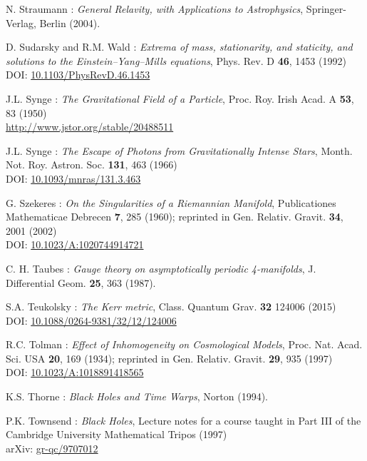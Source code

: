 \begin{thebibliography}{123}
N. Straumann : \emph{General Relavity, with Applications to Astrophysics},
Springer-Verlag, Berlin (2004).

D. Sudarsky and R.M. Wald : {\em Extrema of mass, stationarity, and staticity,
and solutions to the Einstein–Yang–Mills equations},
Phys. Rev. D {\bf 46}, 1453 (1992)\\
DOI: \href{https://doi.org/10.1103/PhysRevD.46.1453}{10.1103/PhysRevD.46.1453}

J.L. Synge : {\em The Gravitational Field of a Particle},
Proc. Roy. Irish Acad. A {\bf 53}, 83 (1950)\\
\url{http://www.jstor.org/stable/20488511}

J.L. Synge : {\em The Escape of Photons from Gravitationally Intense Stars},
Month. Not. Roy. Astron. Soc. {\bf 131}, 463 (1966)\\
DOI: \href{https://doi.org/10.1093/mnras/131.3.463}{10.1093/mnras/131.3.463}

G. Szekeres : {\em On the Singularities of a Riemannian Manifold},
Publicationes Mathematicae Debrecen {\bf 7}, 285 (1960); reprinted in
Gen. Relativ. Gravit. {\bf 34}, 2001 (2002)\\
DOI: \href{https://doi.org/10.1023/A:1020744914721}{10.1023/A:1020744914721}

C. H. Taubes : {\em Gauge theory on asymptotically periodic 4-manifolds},
J. Differential Geom. {\bf 25}, 363 (1987).

S.A. Teukolsky : {\em The Kerr metric},
Class. Quantum Grav. {\bf 32} 124006 (2015)\\
DOI: \href{https://doi.org/10.1088/0264-9381/32/12/124006}{10.1088/0264-9381/32/12/124006}

R.C. Tolman :
{\em Effect of Inhomogeneity on Cosmological Models},
Proc. Nat. Acad. Sci. USA {\bf 20}, 169 (1934);
reprinted in Gen. Relativ. Gravit. {\bf 29}, 935 (1997)\\
DOI: \href{https://doi.org/10.1023/A:1018891418565}{10.1023/A:1018891418565}

K.S. Thorne : {\em Black Holes and Time Warps}, Norton (1994).

P.K. Townsend : {\em Black Holes}, Lecture notes for a course taught in Part III
of the Cambridge University Mathematical Tripos (1997) \\
arXiv: \href{https://arxiv.org/abs/gr-qc/9707012}{gr-qc/9707012}


\end{thebibliography}
